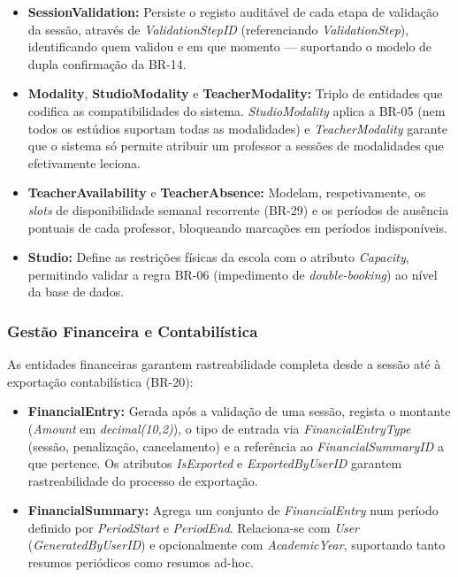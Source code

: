 \documentclass[12pt,a4paper]{report}
\begin{document}
\begin{itemize}
    \item \textbf{SessionValidation:} Persiste o registo auditável de cada etapa de validação da sessão, através de \textit{ValidationStepID} (referenciando \textit{ValidationStep}), identificando quem validou e em que momento — suportando o modelo de dupla confirmação da BR-14.
    \item \textbf{Modality}, \textbf{StudioModality} e \textbf{TeacherModality:} Triplo de entidades que codifica as compatibilidades do sistema. \textit{StudioModality} aplica a BR-05 (nem todos os estúdios suportam todas as modalidades) e \textit{TeacherModality} garante que o sistema só permite atribuir um professor a sessões de modalidades que efetivamente leciona.
    \item \textbf{TeacherAvailability} e \textbf{TeacherAbsence:} Modelam, respetivamente, os \textit{slots} de disponibilidade semanal recorrente (BR-29) e os períodos de ausência pontuais de cada professor, bloqueando marcações em períodos indisponíveis.
    \item \textbf{Studio:} Define as restrições físicas da escola com o atributo \textit{Capacity}, permitindo validar a regra BR-06 (impedimento de \textit{double-booking}) ao nível da base de dados.
\end{itemize}

\subsubsection{Gestão Financeira e Contabilística}
As entidades financeiras garantem rastreabilidade completa desde a sessão até à exportação contabilística (BR-20):
\begin{itemize}
    \item \textbf{FinancialEntry:} Gerada após a validação de uma sessão, regista o montante (\textit{Amount} em \textit{decimal(10,2)}), o tipo de entrada via \textit{FinancialEntryType} (sessão, penalização, cancelamento) e a referência ao \textit{FinancialSummaryID} a que pertence. Os atributos \textit{IsExported} e \textit{ExportedByUserID} garantem rastreabilidade do processo de exportação.
    \item \textbf{FinancialSummary:} Agrega um conjunto de \textit{FinancialEntry} num período definido por \textit{PeriodStart} e \textit{PeriodEnd}. Relaciona-se com \textit{User} (\textit{GeneratedByUserID}) e opcionalmente com \textit{AcademicYear}, suportando tanto resumos periódicos como resumos ad-hoc.
\end{itemize}
\end{document}
